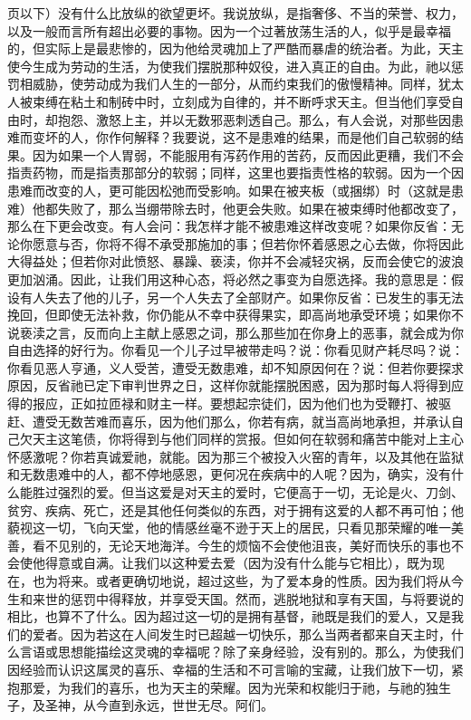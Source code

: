 页以下）没有什么比放纵的欲望更坏。我说放纵，是指奢侈、不当的荣誉、权力，以及一般而言所有超出必要的事物。因为一个过著放荡生活的人，似乎是最幸福的，但实际上是最悲惨的，因为他给灵魂加上了严酷而暴虐的统治者。为此，天主使今生成为劳动的生活，为使我们摆脱那种奴役，进入真正的自由。为此，祂以惩罚相威胁，使劳动成为我们人生的一部分，从而约束我们的傲慢精神。同样，犹太人被束缚在粘土和制砖中时，立刻成为自律的，并不断呼求天主。但当他们享受自由时，却抱怨、激怒上主，并以无数邪恶刺透自己。那么，有人会说，对那些因患难而变坏的人，你作何解释？我要说，这不是患难的结果，而是他们自己软弱的结果。因为如果一个人胃弱，不能服用有泻药作用的苦药，反而因此更糟，我们不会指责药物，而是指责那部分的软弱；同样，这里也要指责性格的软弱。因为一个因患难而改变的人，更可能因松弛而受影响。如果在被夹板（或捆绑）时（这就是患难）他都失败了，那么当绷带除去时，他更会失败。如果在被束缚时他都改变了，那么在下更会改变。有人会问：我怎样才能不被患难这样改变呢？如果你反省：无论你愿意与否，你将不得不承受那施加的事；但若你怀着感恩之心去做，你将因此大得益处；但若你对此愤怒、暴躁、亵渎，你并不会减轻灾祸，反而会使它的波浪更加汹涌。因此，让我们用这种心态，将必然之事变为自愿选择。我的意思是：假设有人失去了他的儿子，另一个人失去了全部财产。如果你反省：已发生的事无法挽回，但即使无法补救，你仍能从不幸中获得果实，即高尚地承受环境；如果你不说亵渎之言，反而向上主献上感恩之词，那么那些加在你身上的恶事，就会成为你自由选择的好行为。你看见一个儿子过早被带走吗？说：你看见财产耗尽吗？说：你看见恶人亨通，义人受苦，遭受无数患难，却不知原因何在？说：但若你要探求原因，反省祂已定下审判世界之日，这样你就能摆脱困惑，因为那时每人将得到应得的报应，正如拉匝禄和财主一样。要想起宗徒们，因为他们也为受鞭打、被驱赶、遭受无数苦难而喜乐，因为他们那么，你若有病，就当高尚地承担，并承认自己欠天主这笔债，你将得到与他们同样的赏报。但如何在软弱和痛苦中能对上主心怀感激呢？你若真诚爱祂，就能。因为那三个被投入火窑的青年，以及其他在监狱和无数患难中的人，都不停地感恩，更何况在疾病中的人呢？因为，确实，没有什么能胜过强烈的爱。但当这爱是对天主的爱时，它便高于一切，无论是火、刀剑、贫穷、疾病、死亡，还是其他任何类似的东西，对于拥有这爱的人都不再可怕；他藐视这一切，飞向天堂，他的情感丝毫不逊于天上的居民，只看见那荣耀的唯一美善，看不见别的，无论天地海洋。今生的烦恼不会使他沮丧，美好而快乐的事也不会使他得意或自满。让我们以这种爱去爱（因为没有什么能与它相比），既为现在，也为将来。或者更确切地说，超过这些，为了爱本身的性质。因为我们将从今生和来世的惩罚中得释放，并享受天国。然而，逃脱地狱和享有天国，与将要说的相比，也算不了什么。因为超过这一切的是拥有基督，祂既是我们的爱人，又是我们的爱者。因为若这在人间发生时已超越一切快乐，那么当两者都来自天主时，什么言语或思想能描绘这灵魂的幸福呢？除了亲身经验，没有别的。那么，为使我们因经验而认识这属灵的喜乐、幸福的生活和不可言喻的宝藏，让我们放下一切，紧抱那爱，为我们的喜乐，也为天主的荣耀。因为光荣和权能归于祂，与祂的独生子，及圣神，从今直到永远，世世无尽。阿们。\par

